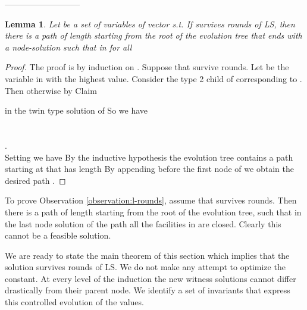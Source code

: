 \documentclass[11pt]{article}\usepackage{amsmath}
\newtheorem{lemma}{Lemma}[section]
\begin{document}
--------------------------- \fi 

\begin{lemma}
Let  be a set of variables  of vector  s.t. 
 If   survives  rounds of LS, then 
 there is a path  of length  starting from the root  of the evolution tree 
that ends with a node-solution  such that in  for all   
\end{lemma}

\begin{proof}
The proof is by induction on .
Suppose that  survive  rounds. Let  be the variable in   with
the highest value. Consider the type 2  child of  corresponding to .
Then  otherwise by Claim
 
 in the twin type  solution
 of  So we have \\
\\
\\
.\\

\noindent
Setting  we have  By the  inductive hypothesis
the evolution tree contains a  path  starting at  that has 
length   By appending   before the first node  of 
we obtain the desired path .
\end{proof}



To prove Observation \ref{observation:l-rounds}, assume that  survives  rounds.
Then there is a path of length  starting from the root of the evolution tree,
such that in  the last
node solution  of the path all the facilities in 
 are closed. Clearly this cannot
be a feasible solution.


\noindent 
We are ready to state the main theorem of this section 
which implies that the solution   survives  
 rounds of LS. We  do not make any attempt to optimize the   constant.
At every level of the induction the new witness solutions cannot
differ drastically from  their parent node. 
We identify a  set of invariants that express this controlled
evolution of the values. 
\end{document}
